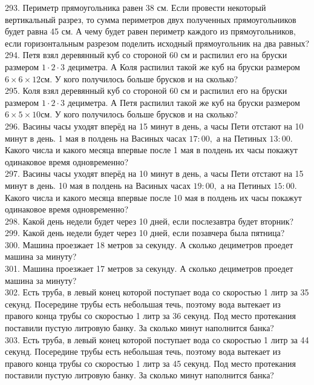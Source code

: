 \documentclass[12pt]{article}
\begin{document}
293. Периметр прямоугольника равен 38 см. Если провести некоторый вертикальный разрез, то сумма периметров двух полученных прямоугольников будет равна 45 см. А чему будет равен периметр каждого из прямоугольников, если горизонтальным разрезом поделить исходный прямоугольник на два равных?\\
294. Петя взял деревянный куб со стороной 60 см и распилил его на бруски размером $1\cdot2\cdot3$ дециметра. А Коля распилил такой же куб на бруски размером $6\times6\times12$см. У кого получилось больше брусков и на сколько?\\
295. Коля взял деревянный куб со стороной 60 см и распилил его на бруски размером $1\cdot2\cdot3$ дециметра. А Петя распилил такой же куб на бруски размером $6\times5\times10$см. У кого получилось больше брусков и на сколько?\\
296. Васины часы уходят вперёд на 15 минут в день, а часы Пети отстают на 10 минут в день. 1 мая в полдень на Васиных часах $17:00,$ а на Петиных $13:00.$ Какого числа и какого месяца впервые после 1 мая в полдень их часы покажут одинаковое время одновременно?\\
297. Васины часы уходят вперёд на 10 минут в день, а часы Пети отстают на 15 минут в день. 10 мая в полдень на Васиных часах $19:00,$ а на Петиных $15:00.$ Какого числа и какого месяца впервые после 10 мая в полдень их часы покажут одинаковое время одновременно?\\
298. Какой день недели будет через 10 дней, если послезавтра будет вторник?\\
299. Какой день недели будет через 10 дней, если позавчера была пятница?\\
300. Машина проезжает 18 метров за секунду. А сколько дециметров проедет машина за минуту?\\
301. Машина проезжает 17 метров за секунду. А сколько дециметров проедет машина за минуту?\\
302. Есть труба, в левый конец которой поступает вода со скоростью 1 литр за 35 секунд. Посередине трубы есть небольшая течь, поэтому вода вытекает из правого конца трубы со скоростью 1 литр за 36 секунд. Под место протекания поставили пустую литровую банку. За сколько минут наполнится банка?\\
303. Есть труба, в левый конец которой поступает вода со скоростью 1 литр за 44 секунд. Посередине трубы есть небольшая течь, поэтому вода вытекает из правого конца трубы со скоростью 1 литр за 45 секунд. Под место протекания поставили пустую литровую банку. За сколько минут наполнится банка?\\
\end{document}
